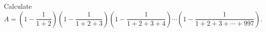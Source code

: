 Calculate
\[
A=\left(1-\dfrac{1}{1+2}\right)\left(1-\dfrac{1}{1+2+3}\right)\left(1-\dfrac{1}{1+2+3+4}\right)\cdots\left(1-\dfrac{1}{1+2+3+\cdots+997}\right).
\]
